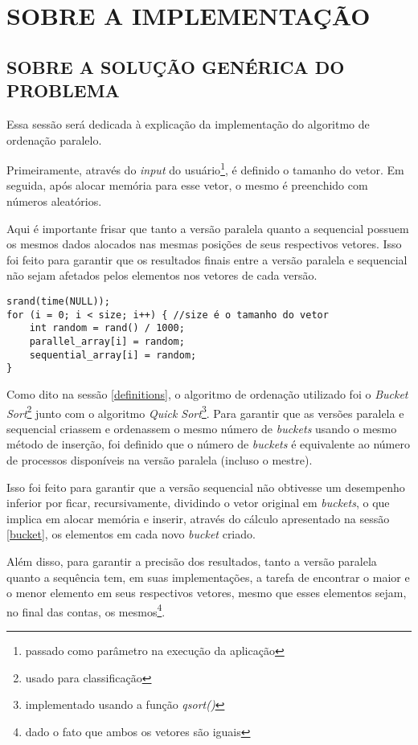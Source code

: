 \section{\normalsize SOBRE A IMPLEMENTAÇÃO}
	
	\subsection{\normalsize SOBRE A SOLUÇÃO GENÉRICA DO PROBLEMA}
	Essa sessão será dedicada à explicação da implementação do algoritmo de ordenação paralelo.
	
	Primeiramente, através do \textit{input} do usuário\footnote{passado como parâmetro na execução da aplicação}, é definido o tamanho do vetor. Em seguida, após alocar memória para esse vetor, o mesmo é preenchido com números aleatórios. 
	
	Aqui é importante frisar que tanto a versão paralela quanto a sequencial possuem os mesmos dados alocados nas mesmas posições de seus respectivos vetores. Isso foi feito para garantir que os resultados finais entre a versão paralela e sequencial não sejam afetados pelos elementos nos vetores de cada versão.
	
	\begin{lstlisting}[style=C]
srand(time(NULL));
for (i = 0; i < size; i++) { //size é o tamanho do vetor
	int random = rand() / 1000;
	parallel_array[i] = random;
	sequential_array[i] = random;
}
	\end{lstlisting}
	
	Como dito na sessão \ref{definitions}, o algoritmo de ordenação utilizado foi o \textit{Bucket Sort}\footnote{usado para classificação} junto com o algoritmo \textit{Quick Sort}\footnote{implementado usando a função \textit{qsort()}}. Para garantir que as versões paralela e sequencial criassem e ordenassem o mesmo número de \textit{buckets} usando o mesmo método de inserção, foi definido que o número de \textit{buckets} é equivalente ao número de processos disponíveis na versão paralela (incluso o mestre).
	
	Isso foi feito para garantir que a versão sequencial não obtivesse um desempenho inferior por ficar, recursivamente, dividindo o vetor original em \textit{buckets}, o que implica em alocar memória e inserir, através do cálculo apresentado na sessão \ref{bucket}, os elementos em cada novo \textit{bucket} criado.
		
	Além disso, para garantir a precisão dos resultados, tanto a versão paralela quanto a sequência tem, em suas implementações, a tarefa de encontrar o maior e o menor elemento em seus respectivos vetores, mesmo que esses elementos sejam, no final das contas, os mesmos\footnote{dado o fato que ambos os vetores são iguais}.
	
